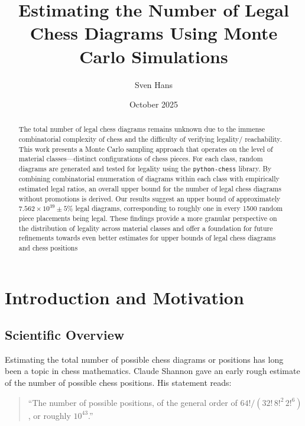 \documentclass[12pt]{article}
\title{Estimating the Number of Legal Chess Diagrams Using Monte Carlo Simulations}
\author{Sven Hans}
\date{October 2025}
\begin{document}
\maketitle

\begin{abstract}
The total number of legal chess diagrams remains unknown due to the immense combinatorial complexity of chess and the difficulty of verifying legality/ reachability. This work presents a Monte Carlo sampling approach that operates on the level of material classes—distinct configurations of chess pieces. For each class, random diagrams are generated and tested for legality using the \texttt{python-chess} library. By combining combinatorial enumeration of diagrams within each class with empirically estimated legal ratios, an overall upper bound for the number of legal chess diagrams without promotions is derived. Our results suggest an upper bound of approximately $7.562\times10^{39}\pm5\%$ legal diagrams, corresponding to roughly one in every 1500 random piece placements being legal. These findings provide a more granular perspective on the distribution of legality across material classes and offer a foundation for future refinements towards even better estimates for upper bounds of legal chess diagrams and chess positions 
\end{abstract}

\section{Introduction and Motivation}

\subsection{Scientific Overview}

Estimating the total number of possible chess diagrams or positions has long been a topic in chess mathematics. Claude Shannon \cite{shannon1950} gave an early rough estimate of the number of possible chess positions. His statement reads:

\begin{quote}
``The number of possible positions, of the general order of 
$64! / (32! \, 8!^2 \, 2!^6)$, or roughly $10^{43}$.''
\end{quote}
\end{document}
